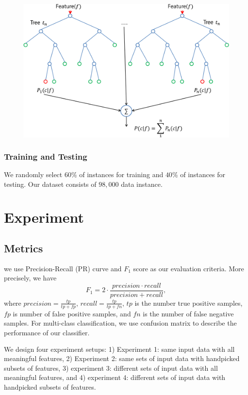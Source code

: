 \documentclass{sig-alternate}
\begin{document}
\begin{figure}[t]
\begin{center}
   \includegraphics[width=0.95\linewidth]{./figures/rf.png}
\end{center}
   \caption{}
\label{fig:rf}
\end{figure}

\subsubsection{Training and Testing}
We randomly select $60\%$ of instances for training and $40\%$ of instances for testing. Our dataset consists of $98,000$ data instance.

\section{Experiment}

\subsection{Metrics}
we use Precision-Recall (PR) curve and $F_1$ score as our evaluation criteria. More precisely, we have
\begin{equation}
F_{1} = 2\cdot\frac{precision \cdot recall}{precision + recall},
\end{equation}
where $precision = \frac{tp}{tp+fp}$, $recall = \frac{tp}{tp+fn}$, $tp$ is the number true positive samples, $fp$ is number of false positive samples, and $fn$ is the number of false negative samples. For multi-class classification, we use confusion matrix to describe the performance of our classifier.

We design four experiment setups: 1) Experiment 1: same input data with all meaningful features, 2) Experiment 2: same sets of input data with handpicked subsets of features, 3) experiment 3: different sets of input data with all meaningful features, and 4) experiment 4: different sets of input data with handpicked subsets of features.
\end{document}
